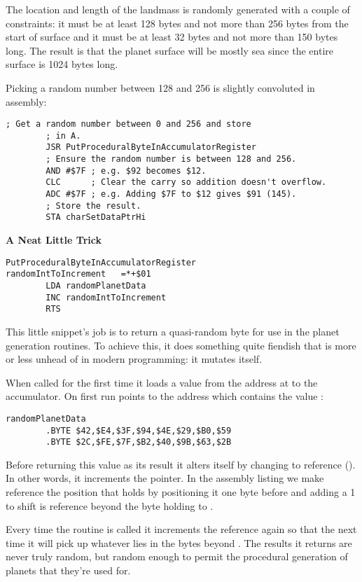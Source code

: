 The location and length of the landmass is randomly generated with a couple of constraints:
it must be at least 128 bytes  and not more than 256 bytes from the start of surface and it must be at least 32 bytes
and not more than 150 bytes long. The result is that the planet surface will be mostly sea
since the entire surface is 1024 bytes long.

Picking a random number between 128 and 256 is slightly convoluted in assembly:

\begin{lstlisting}[caption=Convoluted.]
        ; Get a random number between 0 and 256 and store
        ; in A.
        JSR PutProceduralByteInAccumulatorRegister
        ; Ensure the random number is between 128 and 256.
        AND #$7F ; e.g. $92 becomes $12.
        CLC      ; Clear the carry so addition doesn't overflow.
        ADC #$7F ; e.g. Adding $7F to $12 gives $91 (145).
        ; Store the result.
        STA charSetDataPtrHi
\end{lstlisting}

\begin{q}
\textbf{A Neat Little Trick}

\begin{lstlisting}[caption=Neat.]
PutProceduralByteInAccumulatorRegister
randomIntToIncrement   =*+$01
        LDA randomPlanetData
        INC randomIntToIncrement
        RTS
\end{lstlisting}

This little snippet's job is to return a quasi-random byte for use in the planet generation
routines. To achieve this, it does something quite fiendish that is more or less unhead of in modern
programming: it mutates itself.

When called for the first time it loads a value from the address at  to the accumulator. On first
run  points to the address  which contains the value :

\begin{lstlisting}[caption=Not Quite Random Bytes]
randomPlanetData
        .BYTE $42,$E4,$3F,$94,$4E,$29,$B0,$59
        .BYTE $2C,$FE,$7F,$B2,$40,$9B,$63,$2B
\end{lstlisting}

Before returning this value as its result it alters itself by changing
 to reference  (). In other words, it increments the pointer. In the
assembly listing we make  reference the position
that holds  by positioning it one byte before and
adding a 1 to shift is reference beyond the byte holding  to
.

Every time the routine is called it increments the reference again so that the next time it will pick up whatever
  lies in the bytes beyond . The results it returns are never truly random, but random enough
  to permit the procedural generation of planets that they're used for.

\end{q}

